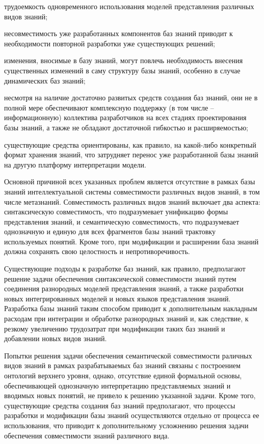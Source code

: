 \begin{SCn}
{\begin{scnitemize}
\item трудоемкость одновременного использования моделей представления различных видов знаний;
\item несовместимость уже разработанных компонентов баз знаний приводит к необходимости повторной разработки уже существующих решений;
\item изменения, вносимые в базу знаний, могут повлечь необходимость внесения существенных изменений в саму структуру базы знаний, особенно в случае динамических баз знаний;
\item несмотря на наличие достаточно развитых средств создания баз знаний, они не в полной мере обеспечивают комплексную поддержку (в том числе – информационную) коллектива разработчиков на всех стадиях проектирования базы знаний, а также не обладают достаточной гибкостью и расширяемостью;
\item существующие средства ориентированы, как правило, на какой-либо конкретный формат хранения знаний, что затрудняет перенос уже разработанной базы знаний на другую платформу интерпретации модели.
\end{scnitemize}

Основной причиной всех указанных проблем является отсутствие в рамках базы знаний интеллектуальной системы совместимости различных видов знаний, в том числе метазнаний. Совместимость различных видов знаний включает два аспекта: синтаксическую совместимость, что подразумевает унификацию формы представления знаний, и семантическую совместимость, что подразумевает однозначную и единую для всех фрагментов базы знаний трактовку используемых понятий. Кроме того, при модификации и расширении база знаний должна сохранять свою целостность и непротиворечивость.

Существующие подходы к разработке баз знаний, как правило, предполагают решение задачи обеспечения синтаксической совместимости знаний путем соединения разнородных моделей представления знаний, а также разработки новых интегрированных моделей и новых языков представления знаний. Разработка базы знаний таким способом приводит к дополнительным накладным расходам при интеграции и обработке разнородных знаний и, как следствие, к резкому увеличению трудозатрат при модификации таких баз знаний и добавлении новых видов знаний.

Попытки решения задачи обеспечения семантической совместимости раличных видов знаний в рамках разрабатываемых баз знаний связаны с построением онтологий верхнего уровня, однако, отсутствие единой формальной основы, обеспечивающей однозначную интерпретацию представляемых знаний и вводимых новых понятий, не привело к решению указанной задачи. Кроме того, существующие средства создания баз знаний предполагают, что процессы разработки и модификации базы знаний осуществляются отдельно от процесса ее использования, что приводит к дополнительному усложнению решения задачи обеспечения совместимости знаний различного вида.}

\scnendstruct

\end{SCn}